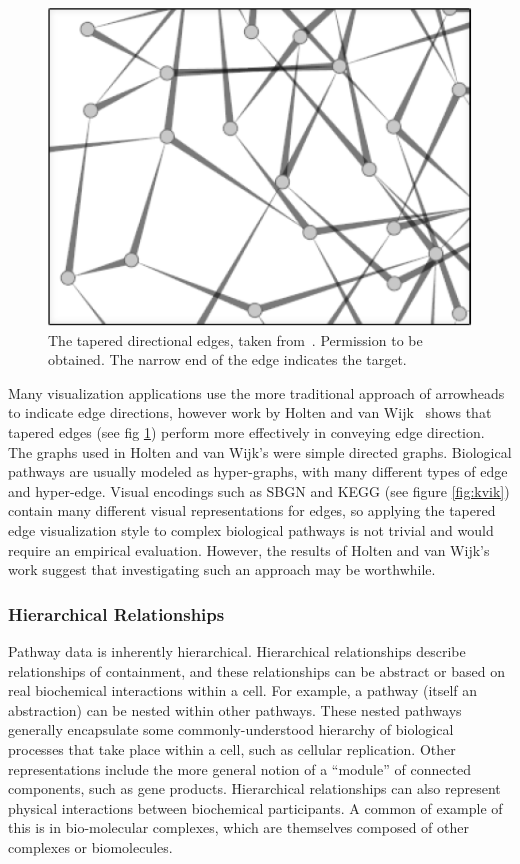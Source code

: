 \documentclass[journal]{vgtc}                %
\begin{document}
\begin{figure}[htb]
  \centering
  \includegraphics[width=0.5\columnwidth]{figures/tapered_edges}
  \caption{\label{fig:tapered_edges} The tapered directional edges, taken from~\cite{Holten2009}. Permission to be obtained. The narrow end of the edge indicates the target.}
\end{figure}
Many visualization applications use the more traditional approach of arrowheads to indicate edge directions, however work by Holten and van Wijk~\cite{Holten2009} shows that tapered edges (see fig \ref{fig:tapered_edges}) perform more effectively in conveying edge direction. The graphs used in Holten and van Wijk's were simple directed graphs. Biological pathways are usually modeled as hyper-graphs, with many different types of edge and hyper-edge. Visual encodings such as SBGN and KEGG (see figure \ref{fig:kvik}) contain many different visual representations for edges, so applying the tapered edge visualization style to complex biological pathways is not trivial and would require an empirical evaluation. However, the results of Holten and van Wijk's work suggest that investigating such an approach may be worthwhile.


\subsubsection{Hierarchical Relationships}

Pathway data is inherently hierarchical.
Hierarchical relationships describe relationships of containment, and these relationships can be abstract or based on real biochemical interactions within a cell.
For example, a pathway (itself an abstraction) can be nested within other pathways.
These nested pathways generally encapsulate some commonly-understood hierarchy of biological processes that take place within a cell, such as cellular replication.
Other representations include the more general notion of a ``module'' of connected components, such as gene products.
Hierarchical relationships can also represent physical interactions between biochemical participants.
A common of example of this is in bio-molecular complexes, which are themselves composed of other complexes or biomolecules.
\end{document}
